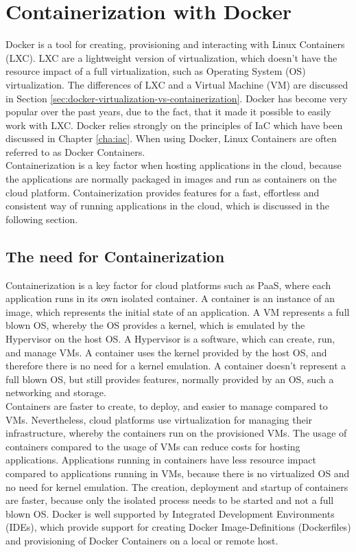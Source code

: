 \chapter{Containerization with Docker}
\label{cha:containerization-docker}
Docker is a tool for creating, provisioning and interacting with Linux Containers (LXC). LXC are a lightweight version of virtualization, which doesn't have the resource impact of a full virtualization, such as Operating System (OS) virtualization. The differences of LXC and a Virtual Machine (VM) are discussed in Section \vref{sec:docker-virtualization-vs-containerization}. Docker has become very popular over the past years, due to the fact, that it made it possible to easily work with LXC. Docker relies strongly on the principles of IaC which have been discussed in Chapter \vref{cha:iac}. When using Docker, Linux Containers are often referred to as Docker Containers\cite{Docker2018,LXC2018}. \\

Containerization is a key factor when hosting applications in the cloud, because the applications are normally packaged in images and run as containers on the cloud platform. Containerization provides features for a fast, effortless and consistent way of running applications in the cloud, which is discussed in the following section.

\section{The need for Containerization}
\label{sec:docker-need-for-containerization}
Containerization is a key factor for cloud platforms such as PaaS, where each application runs in its own isolated container. A container is an instance of an image, which represents the initial state of an application. A VM represents a full blown OS, whereby the OS provides a kernel, which is emulated by the Hypervisor on the host OS. A Hypervisor is a software, which can create, run, and manage VMs. A container uses the kernel provided by the host OS, and therefore there is no need for a kernel emulation. A container doesn't represent a full blown OS, but still provides features, normally provided by an OS, such a networking and storage\cite{DockerVirtScheepers2014}. \\ 

Containers are faster to create, to deploy, and easier to manage compared to VMs. Nevertheless, cloud platforms use virtualization for managing their infrastructure, whereby the containers run on the provisioned VMs. The usage of containers compared to the usage of VMs can reduce costs for hosting applications. Applications running in containers have less resource impact compared to applications running in VMs, because there is no virtualized OS and no need for kernel emulation. The creation, deployment and startup of containers are faster, because only the isolated process needs to be started and not a full blown OS. Docker is well supported by Integrated Development Environments (IDEs), which provide support for creating Docker Image-Definitions (Dockerfiles) and provisioning of Docker Containers on a local or remote host\cite{DockerFile2018}. \\

